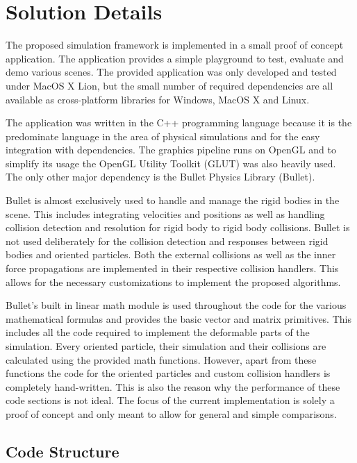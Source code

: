 \chapter{Solution Details}
\label{cha:solution_details}

The proposed simulation framework is implemented in a small proof of concept application. The application provides a simple playground to test, evaluate and demo various scenes. The provided application was only developed and tested under MacOS X Lion, but the small number of required dependencies are all available as cross-platform libraries for Windows, MacOS X and Linux. 

The application was written in the C++ programming language because it is the predominate language in the area of physical simulations and for the easy integration with dependencies. The graphics pipeline runs on OpenGL and to simplify its usage the OpenGL Utility Toolkit (GLUT) was also heavily used. The only other major dependency is the Bullet Physics Library (Bullet).

Bullet is almost exclusively used to handle and manage the rigid bodies in the scene. This includes integrating velocities and positions as well as handling collision detection and resolution for rigid body to rigid body collisions. Bullet is not used deliberately for the collision detection and responses between rigid bodies and oriented particles. Both the external collisions as well as the inner force propagations are implemented in their respective collision handlers. This allows for the necessary customizations to implement the proposed algorithms.

Bullet's built in linear math module is used throughout the code for the various mathematical formulas and provides the basic vector and matrix primitives. This includes all the code required to implement the deformable parts of the simulation. Every oriented particle, their simulation and their collisions are calculated using the provided math functions. However, apart from these functions the code for the oriented particles and custom collision handlers is completely hand-written. This is also the reason why the performance of these code sections is not ideal. The focus of the current implementation is solely a proof of concept and only meant to allow for general and simple comparisons.

\section{Code Structure}


